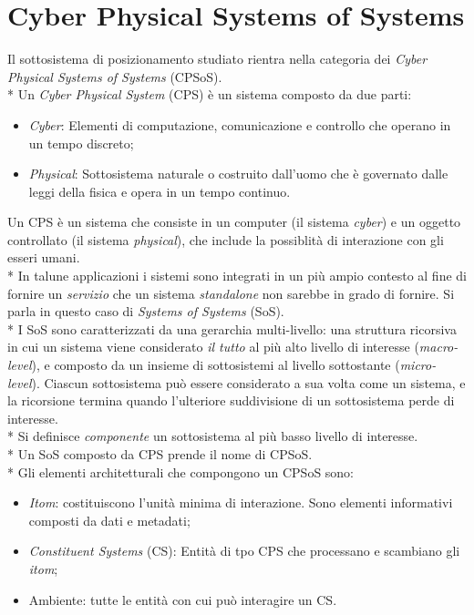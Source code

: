 \section{Cyber Physical Systems of Systems}
Il sottosistema di posizionamento studiato rientra nella categoria dei \emph{Cyber Physical Systems of Systems} (CPSoS). \cite{cecca}\\*
Un \emph{Cyber Physical System} (CPS) \`e un sistema composto da due parti:
\begin{itemize}
	\item \emph{Cyber}: Elementi di computazione, comunicazione e controllo che operano in un tempo discreto;
	\item \emph{Physical}: Sottosistema naturale o costruito dall'uomo che \`e governato dalle leggi della fisica e opera in un tempo continuo.
\end{itemize}
Un CPS \`e un sistema che consiste in un computer (il sistema \emph{cyber}) e un oggetto controllato (il sistema \emph{physical}), che include la possiblit\`a di interazione con gli esseri umani.\\*
In talune applicazioni i sistemi sono integrati in un pi\`u ampio contesto al fine di fornire un \emph{servizio} che un sistema \emph{standalone} non sarebbe in grado di fornire. Si parla in questo caso di \emph{Systems of Systems} (SoS).\\*
I SoS sono caratterizzati da una gerarchia multi-livello: una struttura ricorsiva in cui un sistema viene considerato \emph{il tutto} al pi\`u alto livello di interesse (\emph{macro-level}), e composto da un insieme di sottosistemi al livello sottostante (\emph{micro-level}). Ciascun sottosistema pu\`o essere considerato a sua volta come un sistema, e la ricorsione termina quando l'ulteriore suddivisione di un sottosistema perde di interesse.\\*
Si definisce \emph{componente} un sottosistema al pi\`u basso livello di interesse.\\*
Un SoS composto da CPS prende il nome di CPSoS.\\*
Gli elementi architetturali che compongono un CPSoS sono:
\begin{itemize}
	\item \emph{Itom}: costituiscono l'unit\`a minima di interazione. Sono elementi informativi composti da dati e metadati;
	\item \emph{Constituent Systems} (CS): Entit\`a di tpo CPS che processano e scambiano gli \emph{itom};
	\item Ambiente: tutte le entit\`a con cui pu\`o interagire un CS.
\end{itemize}
